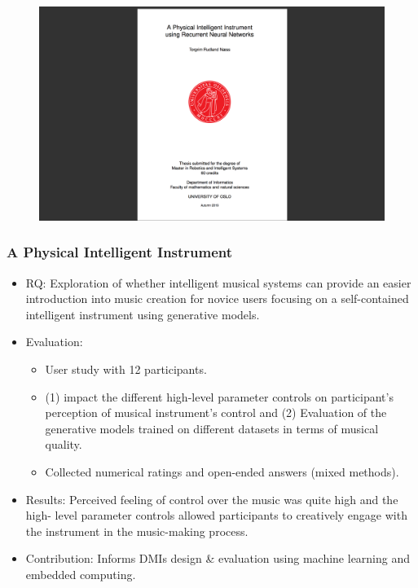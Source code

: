 \documentclass[screen, aspectratio=169]{beamer}
\begin{document}
%
\begin{frame}
\frametitle{}
 \begin{figure}
	\includegraphics[scale=0.3]{img/Torgrim-masterthesis-2019.png}
    \end{figure}		
\end{frame}
%
\begin{frame}
\frametitle{A Physical Intelligent Instrument}	
\begin{itemize}
\item RQ: Exploration of whether intelligent musical systems can provide an easier introduction into music creation for novice users focusing on a self-contained intelligent instrument using generative models.
\item Evaluation:
\begin{itemize}
\item User study with 12 participants.
\item (1) impact the different high-level parameter controls on participant's perception of musical instrument's control and (2) Evaluation of the generative models trained on different datasets in terms of musical quality.
\item Collected numerical ratings and open-ended answers (mixed methods).
\end{itemize}
\item Results: Perceived feeling of control over the music was quite high and the high- level parameter controls allowed participants to creatively engage with the instrument in the music-making process.
\item Contribution: Informs DMIs design \& evaluation using machine learning and embedded computing.
\end{itemize}
\end{frame}
\end{document}
